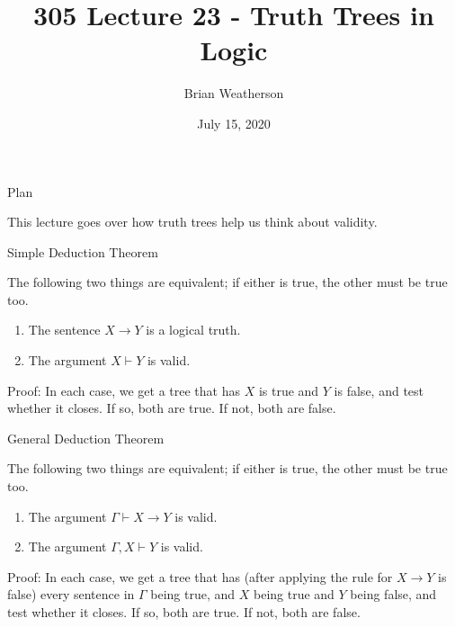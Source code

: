 \documentclass[
  ignorenonframetext,
]{beamer}
\title{305 Lecture 23 - Truth Trees in Logic}
\author{Brian Weatherson}
\date{July 15, 2020}
\providecommand{\tightlist}{%
  \setlength{\itemsep}{0pt}\setlength{\parskip}{0pt}}
\renewcommand{\,}{\text{, }}
\begin{document}
\frame{\titlepage}

\begin{frame}{Plan}
\protect\hypertarget{plan}{}

This lecture goes over how truth trees help us think about validity.

\end{frame}

\begin{frame}{Simple Deduction Theorem}
\protect\hypertarget{simple-deduction-theorem}{}

The following two things are equivalent; if either is true, the other
must be true too.

\begin{enumerate}
\tightlist
\item
  The sentence \(X \rightarrow Y\) is a logical truth.
\item
  The argument \(X \vdash Y\) is valid. \pause
\end{enumerate}

Proof: In each case, we get a tree that has \(X\) is true and \(Y\) is
false, and test whether it closes. If so, both are true. If not, both
are false.

\end{frame}

\begin{frame}{General Deduction Theorem}
\protect\hypertarget{general-deduction-theorem}{}

The following two things are equivalent; if either is true, the other
must be true too.

\begin{enumerate}
\tightlist
\item
  The argument \(\Gamma \vdash X \rightarrow Y\) is valid.
\item
  The argument \(\Gamma, X \vdash Y\) is valid. \pause
\end{enumerate}

Proof: In each case, we get a tree that has (after applying the rule for
\(X \rightarrow Y\) is false) every sentence in \(\Gamma\) being true,
and \(X\) being true and \(Y\) being false, and test whether it closes.
If so, both are true. If not, both are false.

\end{frame}
\end{document}
